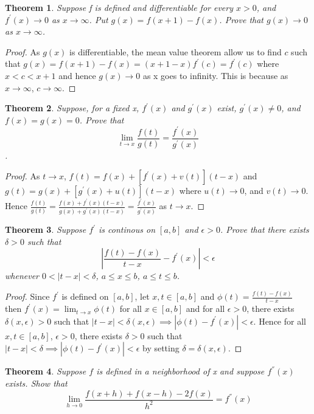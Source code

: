 \documentclass{article}
\theoremstyle{plain}
\newtheorem{theorem}{Theorem}
\theoremstyle{definition}
\begin{document}
\begin{theorem}
	Suppose f is defined and differentiable for every $x > 0$, and $f^{'}(x) \to 0$ as $x \to \infty$. Put $g(x) = f(x + 1) - f(x)$. Prove that $g(x) \to 0$ as $x \to \infty$.
\end{theorem}

\begin{proof}
	As $g(x)$ is differentiable, the mean value theorem allow us to find $c$ such that $g(x) = f(x + 1) - f(x) = (x + 1 - x)f^{'}(c) = f^{'}(c)$ where $x < c < x + 1$ and hence $g(x) \to 0$ as x goes to infinity. This is because as $x \to \infty$, $c \to \infty$.
\end{proof}

\begin{theorem}
	Suppose, for a fixed x, $f^{'}(x)$ and $g^{'}(x)$ exist, $g^{'}(x) \not = 0$, and $f(x) = g(x) = 0$. Prove that $$\lim_{t \to x} \frac{f(t)}{g(t)} = \frac{f^{'}(x)}{g^{'}(x)} $$.
\end{theorem}

\begin{proof}
	As $t \to x$, $f(t) = f(x) + [f^{'}(x) + v(t)](t - x)$ and $g(t) = g(x) + [g^{'}(x)+ u(t)](t - x)$ where $u(t) \to 0$, and $v(t) \to 0$. Hence $\frac{f(t)}{g(t)} = \frac{f(x) + f^{'}(x)(t - x)}{g(x) + g^{'}(x)(t - x)} = \frac{f^{'}(x)}{g^{'}(x)}$ as $t \to x$.
\end{proof}

\begin{theorem}
	Suppose $f^{'}$ is continous on $[a,b]$ and $\epsilon > 0$. Prove that there exists $\delta > 0$ such that $$|\frac{f(t) - f(x)}{t - x} - f^{'}(x)| < \epsilon $$ whenever $ 0 < |t - x| < \delta$, $a \leq x \leq b$, $ a \leq t \leq b$.
\end{theorem}

\begin{proof}
	Since $f^{'}$ is defined on $[a,b]$, let $x,t \in [a,b]$ and  $\phi(t) = \frac{f(t) - f(x)}{t - x}$ then  $f^{'}(x) = \lim_{t \to x} \phi(t)$ for all $x \in [a,b]$ and for all $\epsilon > 0$, there exists $\delta(x,\epsilon) > 0$ such that $|t - x| < \delta(x,\epsilon) \implies |\phi(t) - f^{'}(x)| < \epsilon$. Hence for all $x,t \in [a,b]$, $\epsilon > 0$, there exists $ \delta > 0$ such that  $|t - x| < \delta \implies |\phi(t) - f^{'}(x)| < \epsilon$ by setting $\delta = \delta(x,\epsilon)$.
\end{proof}

\begin{theorem}
	Suppose $f$ is defined in a neighborhood of x and suppose $f^{''}(x)$ exists. Show that $$\lim_{h \to 0} \frac{f(x + h) + f(x - h) - 2f(x)}{h^{2}} = f^{''}(x) $$
\end{theorem}
\end{document}

